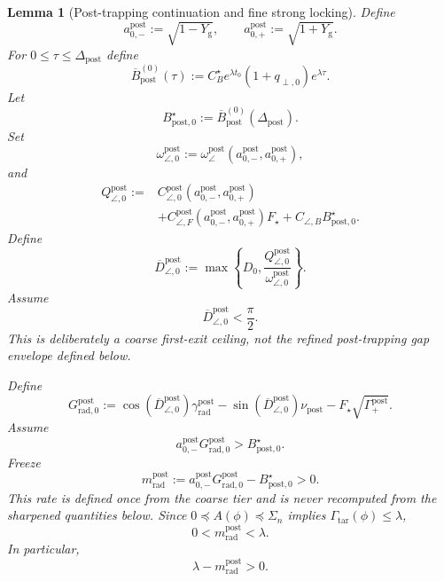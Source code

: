 \documentclass{article} %
\theoremstyle{plain}
\newtheorem{lemma}[theorem]{Lemma}
\theoremstyle{definition}
\theoremstyle{remark}
\begin{document}
\begin{lemma}[Post-trapping continuation and fine strong locking]
Define
\[
\boxed{
a_{0,-}^{\mathrm{post}}:=\sqrt{1-Y_{\mathrm g}},
\qquad
a_{0,+}^{\mathrm{post}}:=\sqrt{1+Y_{\mathrm g}}.
}
\]
For $0\le\tau\le\Delta_{\mathrm{post}}$ define
\[
\boxed{
\overline B_{\mathrm{post}}^{(0)}(\tau)
:=
C_B^\star e^{\lambda t_0}(1+q_{\perp,0})e^{\lambda\tau}.
}
\]
Let
\[
\boxed{
B_{\mathrm{post},0}^\star
:=
\overline B_{\mathrm{post}}^{(0)}(\Delta_{\mathrm{post}}).
}
\]
Set
\[
\omega_{\angle,0}^{\mathrm{post}}
:=
\omega_\angle^{\mathrm{post}}(a_{0,-}^{\mathrm{post}},a_{0,+}^{\mathrm{post}}),
\]
and
\[
\begin{aligned}
Q_{\angle,0}^{\mathrm{post}}
:={}&
C_{\angle,0}^{\mathrm{post}}(a_{0,-}^{\mathrm{post}},a_{0,+}^{\mathrm{post}})
\\
&+
C_{\angle,F}^{\mathrm{post}}(a_{0,-}^{\mathrm{post}},a_{0,+}^{\mathrm{post}})
F_\star
+
C_{\angle,B}B_{\mathrm{post},0}^\star.
\end{aligned}
\]
Define
\[
\boxed{
\overline D_{\angle,0}^{\mathrm{post}}
:=
\max\left\{D_0,\frac{Q_{\angle,0}^{\mathrm{post}}}{\omega_{\angle,0}^{\mathrm{post}}}\right\}.
}
\]
Assume
\[
\boxed{
\overline D_{\angle,0}^{\mathrm{post}}<\frac\pi2.
}
\]
This is deliberately a coarse first-exit ceiling, not the refined
post-trapping gap envelope defined below.

Define
\[
\boxed{
G_{\mathrm{rad},0}^{\mathrm{post}}
:=
\cos(\overline D_{\angle,0}^{\mathrm{post}})\gamma_{\mathrm{rad}}^{\mathrm{post}}
-
\sin(\overline D_{\angle,0}^{\mathrm{post}})\nu_{\mathrm{post}}
-
F_\star\sqrt{\Gamma_+^{\mathrm{post}}}.
}
\]
Assume
\[
\boxed{
a_{0,-}^{\mathrm{post}}G_{\mathrm{rad},0}^{\mathrm{post}}
>
B_{\mathrm{post},0}^\star.
}
\]
Freeze
\[
\boxed{
m_{\mathrm{rad}}^{\mathrm{post}}
:=
a_{0,-}^{\mathrm{post}}G_{\mathrm{rad},0}^{\mathrm{post}}
-
B_{\mathrm{post},0}^\star
>0.
}
\]
This rate is defined once from the coarse tier and is never recomputed from
the sharpened quantities below.  Since
$0\preceq A(\phi)\preceq\Sigma_n$ implies
$\Gamma_{\mathrm{tar}}(\phi)\le\lambda$,
\[
\boxed{
0<m_{\mathrm{rad}}^{\mathrm{post}}<\lambda.
}
\]
In particular,
\[
\boxed{\lambda-m_{\mathrm{rad}}^{\mathrm{post}}>0.}
\]



\end{lemma}
\end{document}
